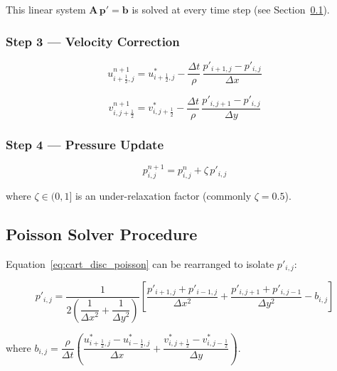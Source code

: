 This linear system $\mathbf{A}\,\mathbf{p}'=\mathbf{b}$ is solved at every time step (see Section~\ref{sec:cart_poisson_solver}).

\subsubsection{Step 3 --- Velocity Correction}

\begin{equation}
\boxed{
    u^{n+1}_{i+\frac{1}{2},j} = u^*_{i+\frac{1}{2},j}
    - \frac{\Delta t}{\rho}\,\frac{p'_{i+1,j}-p'_{i,j}}{\Delta x}
}
\label{eq:cart_corr_u}
\end{equation}

\begin{equation}
\boxed{
    v^{n+1}_{i,j+\frac{1}{2}} = v^*_{i,j+\frac{1}{2}}
    - \frac{\Delta t}{\rho}\,\frac{p'_{i,j+1}-p'_{i,j}}{\Delta y}
}
\label{eq:cart_corr_v}
\end{equation}

\subsubsection{Step 4 --- Pressure Update}

\begin{equation}
\boxed{
    p^{n+1}_{i,j} = p^{n}_{i,j} + \zeta\,p'_{i,j}
}
\label{eq:cart_pupdate}
\end{equation}

where $\zeta \in (0,1]$ is an under-relaxation factor (commonly $\zeta = 0.5$).

\subsection{Poisson Solver Procedure}
\label{sec:cart_poisson_solver}

Equation~\eqref{eq:cart_disc_poisson} can be rearranged to isolate $p'_{i,j}$:

\begin{equation}
    p'_{i,j} = \frac{1}{2\!\left(\dfrac{1}{\Delta x^2}+\dfrac{1}{\Delta y^2}\right)}
    \left[
        \frac{p'_{i+1,j}+p'_{i-1,j}}{\Delta x^2}
       +\frac{p'_{i,j+1}+p'_{i,j-1}}{\Delta y^2}
       - b_{i,j}
    \right]
    \label{eq:cart_gs}
\end{equation}

where
$b_{i,j} = \dfrac{\rho}{\Delta t}
\!\left(\dfrac{u^*_{i+\frac{1}{2},j}-u^*_{i-\frac{1}{2},j}}{\Delta x}
        +\dfrac{v^*_{i,j+\frac{1}{2}}-v^*_{i,j-\frac{1}{2}}}{\Delta y}\right)$.

